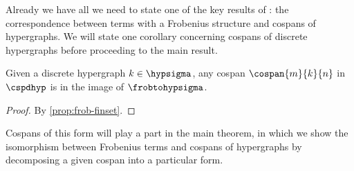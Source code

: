 Already we have all we need to state one of the key results of
\cite{bonchi2022string}: the correspondence between terms with a Frobenius
structure and cospans of hypergraphs.
We will state one corollary concerning cospans of discrete hypergraphs before
proceeding to the main result.

\begin{corollary}
    \label{cor:discrete-hypergraph-frob}
    Given a discrete hypergraph \(k \in \hypsigma\), any cospan
    \(\cospan{m}{k}{n}\) in \(\cspdhyp\) is in the
    image of \(\frobtohypsigma\).
\end{corollary}
\begin{proof}
    By \cref{prop:frob-finset}.
\end{proof}

Cospans of this form will play a part in the main theorem, in which we show the
isomorphism between Frobenius terms and cospans of hypergraphs by decomposing a
given cospan into a particular form.

